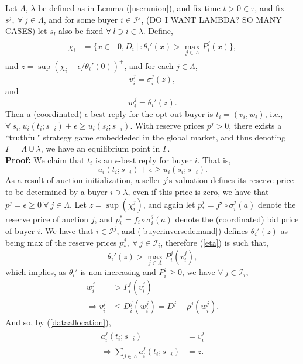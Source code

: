 \documentclass[sigconf, anonymous]{acmart}
\newcommand{\mcI}{\mathcal{I}}
\newcommand{\g}{\sigma}
\theoremstyle{definition}
\begin{document}
{
Let $\Lambda$, $\lambda$ be defined as in Lemma (\ref{userunion}), and fix time
$t>0 \in \tau$, and fix $s^j, \ \forall \ j\in\Lambda$, and for some
buyer $i\in \mcI^j$, (DO I WANT LAMBDA? SO MANY CASES) let $s_l$ also be fixed $\forall \ l\ni i \in \lambda$. Define,
\begin{align}
\begin{split}\label{eta}
    \chi_i &= \bigg\lbrace x\in [0,D_i] : 
 {\theta_i}'(x) > \max_{j\in\Lambda}P_i^j(x)\bigg\rbrace, 
\end{split}
\end{align}
and $z = \sup(\chi_i - \epsilon / \theta_i'(0))^+$, and for each $j \in
\Lambda$, 
$$
    v_i^j = \g_i^{j}(z),
$$
and 
$$
    w_i^j = \theta_i'(z).%
$$
Then a (coordinated) $\epsilon$-best reply for the opt-out buyer is $t_i =
(v_i,w_i)$, i.e., $\forall \ s_i, u_i(t_i;s_{-i}) + \epsilon \ge u_i(s_i;
s_{-i})$.
With reserve prices $p^j >0$, there exists a ``truthful" strategy game embeddeded
in the global market, and thus denoting $\Gamma= \Lambda \cup \lambda$, we have
an equilibrium point in $\Gamma$. 
}\\
\textbf{Proof:}
We claim that $t_i$ is an $\epsilon$-best reply for buyer $i$. That is,
$$
    u_i(t_i;s_{-i}) + \epsilon \ge u_i(s_i;s_{-i}).
$$
As a result of auction initialization, a seller $j$'s valuation defines its
reserve price to be determined
by a buyer $i \ni \lambda$, even if this price is zero, we have that $p^j =
\epsilon \ge 0 \ \forall \ j \in\Lambda$.
Let $z = \sup(\chi_i^j)$, and again let $p_*^j = f^j \circ \g_i^j(a) $ denote the reserve
price of auction $j$, and $p_i^*= f_i \circ \g_i^j(a)$ denote the (coordinated) bid price of buyer $i$. 
We have that $i\in\mcI^j$, 
and (\ref{buyerinversedemand}) defines $\theta_i'(z)$ as being
max of the reserve prices $p_*^j,\ \forall \ j\in\mcI_i$, therefore
(\ref{eta}) is such that,
$$
    \theta_i'(z) > \max_{j\in\Lambda}P_i^j(v_i^j),
$$ 
which implies, as $\theta_i'$ is non-increasing and $P_i^j \ge 0$,
we have $\forall \ j \in \mcI_i$, 
\begin{align*}
    w_i^j &> P_i^j(v_i^j) \\
    \Rightarrow v_i^j &\le D_i^j(w_i^j) = D^j - \rho^j(w_i^j).
\end{align*}
And so, by (\ref{dataallocation}),
\begin{align*}
    a_i^j(t_i;s_{-i}) &= v_i^j \\
    \Rightarrow \displaystyle\sum_{j\in\Lambda} a_i^j(t_i;s_{-i}) &= z.
\end{align*}
\end{document}
